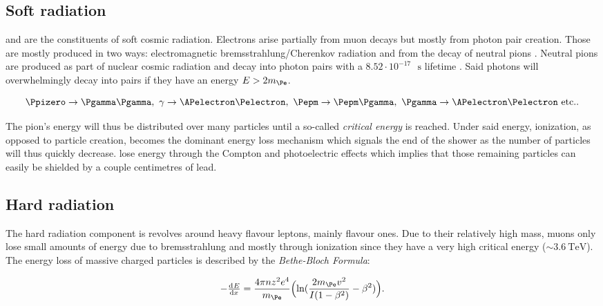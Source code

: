 \subsection{Soft radiation}

\Pgamma and \Pepm are the constituents of soft cosmic radiation. Electrons arise partially from muon decays but mostly from photon pair creation. Those are mostly produced in two ways: electromagnetic bremsstrahlung/Cherenkov radiation and from the decay of neutral pions \Ppizero. Neutral pions are produced as part of nuclear cosmic radiation and decay into photon pairs with a $8.52 \cdot 10^{-17}\text{ }\si{\second}$ lifetime \cite{Tanabashi:2018oca}. Said photons will overwhelmingly decay into \Pepm pairs if they have an energy $E>2m_{\Pe}$.

\begin{equation*}
\Ppizero\rightarrow\Pgamma\Pgamma,\text{   }\gamma\rightarrow\APelectron\Pelectron,\text{   }\Pepm\rightarrow\Pepm\Pgamma,\text{   }\Pgamma\rightarrow\APelectron\Pelectron \text{   etc.}.
\end{equation*}


The pion's energy will thus be distributed over many particles until a so-called \textit{critical energy} is reached. Under said energy, ionization, as opposed to particle creation, becomes the dominant energy loss mechanism which signals the end of the shower as the number of particles will thus quickly decrease. \Pgamma lose energy through the Compton and photoelectric effects which implies that those remaining particles can easily be shielded by a couple centimetres of lead.

\subsection{Hard radiation}

The hard radiation component is revolves around heavy flavour leptons, mainly \Pmu flavour ones. Due to their relatively high mass, muons only lose small amounts of energy due to bremsstrahlung and mostly through ionization since they have a very high critical energy ($\sim \SI{3.6}{\TeV}$). The energy loss of massive charged particles is described by the \textit{Bethe-Bloch Formula}:

\begin{equation}
-\od{E}{x}=\frac{4\pi n z^2 e^4}{m_{\Pe}}\Big(\text{ln}(\frac{2m_{\Pe}v^2}{I(1-\beta^2)}-\beta^2)  \Big).
\end{equation}

